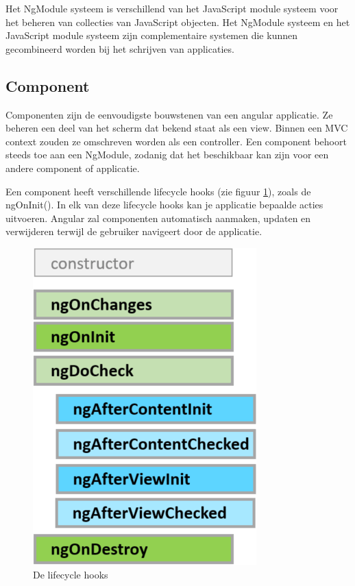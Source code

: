 Het NgModule systeem is verschillend van het JavaScript module systeem voor het beheren van collecties van JavaScript objecten. Het NgModule systeem en het JavaScript module systeem zijn complementaire systemen die kunnen gecombineerd worden bij het schrijven van applicaties. 

\subsection{Component}
Componenten zijn de eenvoudigste bouwstenen van een angular applicatie. Ze beheren een deel van het scherm dat bekend staat als een view. Binnen een MVC context zouden ze omschreven worden als een controller. Een component behoort steeds toe aan een NgModule, zodanig dat het beschikbaar kan zijn voor een andere component of applicatie. 

Een component heeft verschillende lifecycle hooks (zie figuur \ref{fig:lifecyclehooks}), zoals de ngOnInit(). In elk van deze lifecycle hooks kan je applicatie bepaalde acties uitvoeren. Angular zal componenten automatisch aanmaken, updaten en verwijderen terwijl de gebruiker navigeert door de applicatie. 

\begin{figure}[H]
	\centering
	\includegraphics[width=0.6\linewidth]{lifecyclehooks}
	\caption{De lifecycle hooks \autocite{dartlang2019}}
	\label{fig:lifecyclehooks}
\end{figure}

